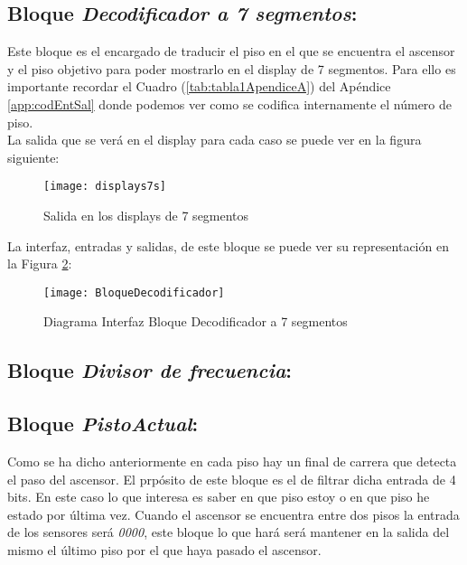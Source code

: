 \subsection{Bloque \textit{Decodificador a 7 segmentos}:} \label{bloque:Decodificador7s}
    Este bloque es el encargado de traducir el piso en el que se encuentra el ascensor y el piso objetivo para poder mostrarlo en el display de 7 segmentos. Para ello es importante recordar el Cuadro (\ref{tab:tabla1ApendiceA}) del Apéndice \ref{app:codEntSal} donde podemos ver como se codifica internamente el número de piso. \\ 
    
    La salida que se verá en el display para cada caso se puede ver en la figura siguiente:
    
    \begin{figure}[H]
		    \centering
		    \texttt{[image: displays7s]}
		    \caption{Salida en los displays de 7 segmentos}
		    \label{fig:displays7s}
	\end{figure}
    
    La interfaz, entradas y salidas, de este bloque se puede ver su representación en la Figura \ref{fig:BloqueDecodificador7seg}:
    
    \begin{figure}[H]
		    \centering
		    \texttt{[image: BloqueDecodificador]}
		    \caption{Diagrama Interfaz Bloque Decodificador a 7 segmentos}
		    \label{fig:BloqueDecodificador7seg}
	\end{figure}
\subsection{Bloque \textit{Divisor de frecuencia}:} \label{bloque:DivisorFrecuencia}

\subsection{Bloque \textit{PistoActual}:} \label{bloque:PisoActual}
    Como se ha dicho anteriormente en cada piso hay un final de carrera que detecta el paso del ascensor. El prpósito de este bloque es el de filtrar dicha entrada de 4 bits. En este caso lo que interesa es saber en que piso estoy o en que piso he estado por última vez. Cuando el ascensor se encuentra entre dos pisos la entrada de los sensores será \textit{0000}, este bloque lo que hará será mantener en la salida del mismo el último piso por el que haya pasado el ascensor. \\ 
    
